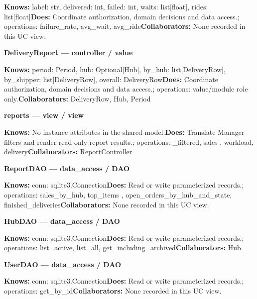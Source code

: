 \textbf{Knows:} label: str, delivered: int, failed: int, waits: list[float], rides: list[float]\newline{}\textbf{Does:} Coordinate authorization, domain decisions and data access.; operations: failure\_rate, avg\_wait, avg\_ride\newline{}\textbf{Collaborators:} None recorded in this UC view.

\textbf{DeliveryReport --- controller / \guillemotleft{}value\guillemotright{}}

\textbf{Knows:} period: Period, hub: Optional[Hub], by\_hub: list[DeliveryRow], by\_shipper: list[DeliveryRow], overall: DeliveryRow\newline{}\textbf{Does:} Coordinate authorization, domain decisions and data access.; operations: value/module role only.\newline{}\textbf{Collaborators:} DeliveryRow, Hub, Period

\textbf{reports --- view / \guillemotleft{}view\guillemotright{}}

\textbf{Knows:} No instance attributes in the shared model.\newline{}\textbf{Does:} Translate Manager filters and render read-only report results.; operations: \_filtered, sales , workload, delivery\newline{}\textbf{Collaborators:} ReportController

\textbf{ReportDAO --- data\_access / \guillemotleft{}DAO\guillemotright{}}

\textbf{Knows:} conn: sqlite3.Connection\newline{}\textbf{Does:} Read or write parameterized records.; operations: sales\_by\_hub, top\_items , open\_orders\_by\_hub\_and\_state, finished\_deliveries\newline{}\textbf{Collaborators:} None recorded in this UC view.

\textbf{HubDAO --- data\_access / \guillemotleft{}DAO\guillemotright{}}

\textbf{Knows:} conn: sqlite3.Connection\newline{}\textbf{Does:} Read or write parameterized records.; operations: list\_active, list\_all, get\_including\_archived\newline{}\textbf{Collaborators:} Hub

\textbf{UserDAO --- data\_access / \guillemotleft{}DAO\guillemotright{}}

\textbf{Knows:} conn: sqlite3.Connection\newline{}\textbf{Does:} Read or write parameterized records.; operations: get\_by\_id\newline{}\textbf{Collaborators:} None recorded in this UC view.

